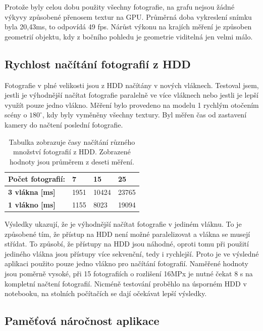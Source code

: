 \documentclass[11pt,twoside,a4paper]{book}
\begin{document}
Protože byly celou dobu použity všechny fotografie, na grafu nejsou žádné výkyvy způsobené přenosem textur na GPU. Průměrná doba vykreslení snímku byla 20,43ms, to odpovídá 49 fps. Nárůst výkonu na krajích měření je způsoben geometrií objektu, kdy z bočního pohledu je geometrie viditelná jen velmi málo.

\subsection{Rychlost načítání fotografií z HDD}

Fotografie v plné velikosti jsou z HDD načítány v nových vláknech. Testoval jsem, jestli je výhodnější načítat fotografie paralelně ve více vláknech nebo jestli je lepší využít pouze jedno vlákno. Měření bylo provedeno na modelu 1 rychlým otočením scény o $180^{\circ}$, kdy byly vyměněny všechny textury. Byl měřen čas od zastavení kamery do načtení poslední fotografie.

\begin{table}[ht]
\begin{center}
%
\begin{tabularx}{\textwidth}{ |l|R|R|R| }
\hline
\textbf{Počet fotografií:}  & \textbf{7} & \textbf{15} & \textbf{25} \\ \hline
\textbf{3 vlákna [ms]} & 1951 & 10424 & 23765  \\ \hline
\textbf{1 vlákno  [ms]} & 1155 & 8023 & 19094  \\ \hline
\end{tabularx}
\caption{Tabulka zobrazuje časy načítání různého množství fotografií z HDD. Zobrazené hodnoty jsou průměrem z deseti měření.}
\label{tab:test-6}
\end{center}
\end{table}

Výsledky ukazují, že je výhodnější načítat fotografie v jediném vláknu. To je způsobené tím, že přístup na HDD není možné paralelizovat a vlákna se musejí střídat. To způsobí, že přístupy na HDD jsou náhodné, oproti tomu při použití jediného vlákna jsou přístupy více sekvenční, tedy i rychlejší. Proto je ve výsledné aplikaci použito pouze jedno vlákno pro načítání fotografií. Naměřené hodnoty jsou poměrně vysoké, při 15 fotografiích o rozlišení 16MPx je nutné čekat 8 s na kompletní načtení fotografií. Nicméně testování proběhlo na úsporném HDD v notebooku, na stolních počítačích se dají očekávat lepší výsledky.


\subsection{Paměťová náročnost aplikace}
\end{document}

